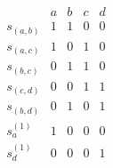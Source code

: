 \documentclass[tikz]{standalone}
\begin{document}
    \[
        \begin{array}{c|cccc}
                       & a & b & c & d \\
            \hline
            s_{(a, b)} & 1 & 1 & 0 & 0 \\
            s_{(a, c)} & 1 & 0 & 1 & 0 \\
            s_{(b, c)} & 0 & 1 & 1 & 0 \\
            s_{(c, d)} & 0 & 0 & 1 & 1 \\
            s_{(b, d)} & 0 & 1 & 0 & 1 \\
            \hline
            s_a^{(1)} & 1 & 0 & 0 & 0 \\
            s_d^{(1)} & 0 & 0 & 0 & 1 \\
        \end{array}
    \]
\end{document}
